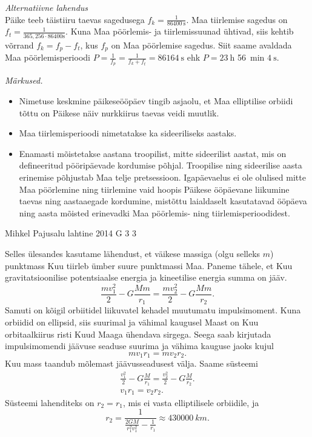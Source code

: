 \documentclass[11pt, twoside]{article}
\begin{document}
{{\vspace{0.5\baselineskip}
\emph{Alternatiivne lahendus}\\
Päike teeb täistiiru taevas sagedusega $f_k=\frac{1}{\SI{86400}{\second}}$. Maa tiirlemise sagedus on $f_t=\frac{1}{365,256\cdot86400\text{s}}$. Kuna Maa pöörlemis- ja tiirlemissuunad ühtivad, siis kehtib võrrand $f_k=f_p-f_t$, kus $f_p$ on Maa pöörlemise sagedus. Siit saame avaldada Maa pöörlemisperioodi $P=\frac{1}{f_p}=\frac{1}{f_k+f_t}=\SI{86164}{\second}$ ehk $P=\SI{23}{\hour}$ \SI{56}{\minute} $\SI{4}{\second}$.

\emph{Märkused.}

\vspace{-5pt}
\begin{itemize}[noitemsep, leftmargin=*]
\item Nimetuse keskmine päikeseööpäev tingib asjaolu, et Maa elliptilise orbiidi tõttu on Päikese näiv nurkkiirus taevas veidi muutlik.
\item Maa tiirlemisperioodi nimetatakse ka sideeriliseks aastaks. 
\item Enamasti mõistetakse aastana troopilist, mitte sideerilist aastat, mis on defineeritud pööripäevade kordumise põhjal. Troopilise ning sideerilise aasta erinemise põhjustab Maa telje pretsessioon. Igapäevaelus ei ole olulised mitte Maa pöörlemine ning tiirlemine vaid hoopis Päikese ööpäevane liikumine taevas ning aastaaegade kordumine, mistõttu laialdaselt kasutatavad ööpäeva ning aasta mõisted erinevadki Maa pöörlemis- ning tiirlemisperioodidest.  
\end{itemize}
\fi
}

{Mihkel Pajusalu} %
{lahtine} %
{2014} %
{G 3} %
{3} %
{

\ifSolution
Selles ülesandes kasutame lähendust, et väikese massiga (olgu selleks $m$) punktmass Kuu tiirleb ümber suure punktmassi Maa. Paneme tähele, et Kuu gravitatsioonilise potentsiaalse energia ja kineetilise energia summa on jääv.
$$
\frac{mv_1^2}{2}-G\frac{Mm}{r_1}=\frac{mv_2^2}{2}-G\frac{Mm}{r_2}.
$$
Samuti on kõigil orbiitidel liikuvatel kehadel muutumatu impulsimoment. Kuna orbiidid on ellipsid, siis suurimal ja vähimal kaugusel Maast on Kuu orbitaalkiirus risti Kuud Maaga ühendava sirgega. Seega saab kirjutada impulsimomendi jäävuse seaduse suurima ja vähima kauguse jaoks kujul
$$
mv_1r_1=mv_2r_2.
$$
Kuu mass taandub mõlemast jäävusseadusest välja. Saame süsteemi
$$
\begin{array}{c} 
\frac{v_1^2}{2}-G\frac{M}{r_1}=\frac{v_2^2}{2}-G\frac{M}{r_2}.\\
v_1r_1=v_2r_2.
\end{array}
$$
Süsteemi lahenditeks on $r_2=r_1$, mis ei vasta elliptilisele orbiidile, ja $$r_2=\frac{1}{\frac{2GM}{r_1^2v_1^2}-\frac{1}{r_1}}\approx\SI{430000}{km}.$$
\fi
}

}
\end{document}
